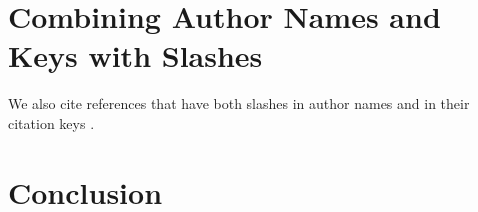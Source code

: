 \documentclass[conference,a4paper,english]{IEEEtran}[2015/08/26]
\begin{document}
\section{Combining Author Names and Keys with Slashes}
We also cite references that have both slashes in author names and in their citation keys \cite{w3c/html/css}.

\section{Conclusion}
\lipsum[4]



\end{document}
